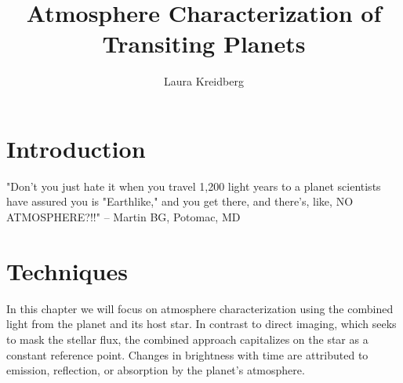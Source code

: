\documentclass[graybox,natbib,nosecnum]{svmult}
\begin{document}
\title*{Atmosphere Characterization of Transiting Planets}
\author{Laura Kreidberg}
%
%
\maketitle




\section{Introduction }
"Don't you just hate it when you travel 1,200 light years to a planet scientists have assured you is "Earthlike," and you get there, and there's, like, NO ATMOSPHERE?!!" -- Martin BG, Potomac, MD



\section{Techniques} 
In this chapter we will focus on atmosphere characterization using the combined light from the planet and its host star. In contrast to direct imaging, which seeks to mask the stellar flux, the combined approach capitalizes on the star as a constant reference point. Changes in brightness with time are attributed to emission, reflection, or absorption by the planet's atmosphere.
\end{document}
